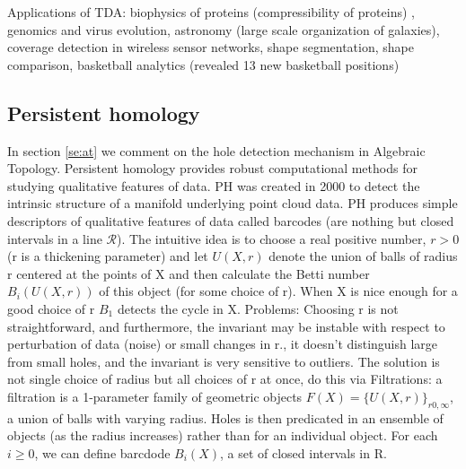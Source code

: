 \documentclass[onecollarge,runningheads]{svjour2}
\begin{document}
Applications of TDA: biophysics of proteins (compressibility of proteins) , genomics and virus evolution, astronomy (large scale organization of galaxies), coverage detection in wireless sensor networks, shape segmentation, shape comparison, basketball analytics (revealed 13 new basketball positions) %

\subsection{Persistent homology}
\label{sec:pj}

In section \ref{se:at} we comment on the hole detection mechanism in Algebraic Topology. Persistent homology provides robust computational methods for studying qualitative features of data. PH was created in 2000 to detect the intrinsic structure of a manifold underlying point cloud data. PH produces simple descriptors of qualitative features of data called barcodes (are nothing but closed intervals in a line $\mathcal{R}$).
The intuitive idea is to choose a real positive number, $r > 0$ (r is a thickening parameter) and let $U(X,r)$ denote the union of balls of radius r centered at the points of X and then calculate the Betti number $B_i(U(X,r))$ of this object (for some choice of r). %
When X is nice enough for a good choice of r $B_1$ detects the cycle in X. 
Problems:
Choosing r is not straightforward, and furthermore, the invariant may  be instable with respect to perturbation of data (noise) or small changes in r., it doesn't distinguish large from small holes, and the invariant is very sensitive to outliers.
The solution is not single choice of radius but all choices of r at once, do this via Filtrations: a  filtration is a 1-parameter family of geometric objects
$F(X) = \{U(X, r)\}_{r  0, \infty}$, a union of balls with varying radius. Holes is then predicated in an ensemble of objects (as the radius increases) rather than for an individual object. For each $i \geq 0$, we can define barcdode $B_i(X)$, a set of closed intervals in R.
\end{document}
